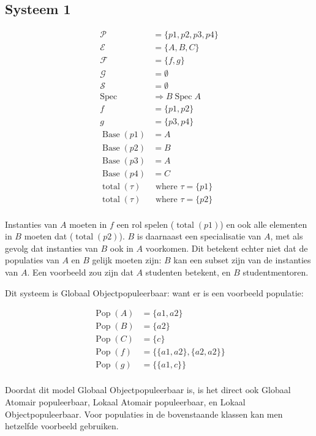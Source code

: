 \documentclass{article}
\newcommand{\Spec}{\ensuremath{\operatorname{Spec}}}
\newcommand{\Base}{\ensuremath{\operatorname{Base}}}
\newcommand{\total}{\ensuremath{\operatorname{total}}}
\newcommand{\Pop}{\ensuremath{\operatorname{Pop}}}
\begin{document}
\subsection{Systeem 1}
\begin{align*}
  \mathcal{P}    & = \{p1,p2,p3,p4\}\\
  \mathcal{E} & = \{A,B,C\} \\
  \mathcal{F} & = \{f,g\}   \\
  \mathcal{G} & = \emptyset        \\  
  \mathcal{S} & = \emptyset        \\
  \Spec       &\Rightarrow B \Spec A       \\
  f           & = \{p1,p2\} \\   
  g           & = \{p3,p4\} \\
  \Base (p1)   & = A         \\
  \Base (p2)   & = B         \\
  \Base (p3)   & = A         \\
  \Base (p4)   & = C        \\ 
  \total (\tau) &\text{ where } \tau = \{p1\} \\
  \total (\tau) &\text{ where } \tau = \{p2\} \\
\end{align*}

Instanties van $A$ moeten in $f$ een rol spelen ($\total (p1)$) en ook alle
elementen in $B$ moeten dat ($\total (p2)$). $B$ is daarnaast een specialisatie
van $A$, met als gevolg dat instanties van $B$ ook in $A$ voorkomen. Dit
betekent echter niet dat de populaties van $A$ en $B$ gelijk moeten zijn: $B$
kan een subset zijn van de instanties van $A$. Een voorbeeld zou zijn dat $A$
studenten betekent, en $B$ studentmentoren.

Dit systeem is Globaal Objectpopuleerbaar: want er is een voorbeeld populatie:

\begin{align*}
  \Pop (A) & = \{a1,a2\}                 \\
  \Pop (B) & = \{a2\}                    \\
  \Pop (C) & = \{c\}                     \\
  \Pop (f) & = \{ \{a1,a2\}, \{a2,a2\}\} \\
  \Pop (g) & = \{ \{a1,c \} \}           \\
\end{align*}

Doordat dit model Globaal Objectpopuleerbaar is, is het direct ook Globaal
Atomair populeerbaar, Lokaal Atomair populeerbaar, en Lokaal
Objectpopuleerbaar. Voor populaties in de bovenstaande klassen kan men
hetzelfde voorbeeld gebruiken.\\
\end{document}
